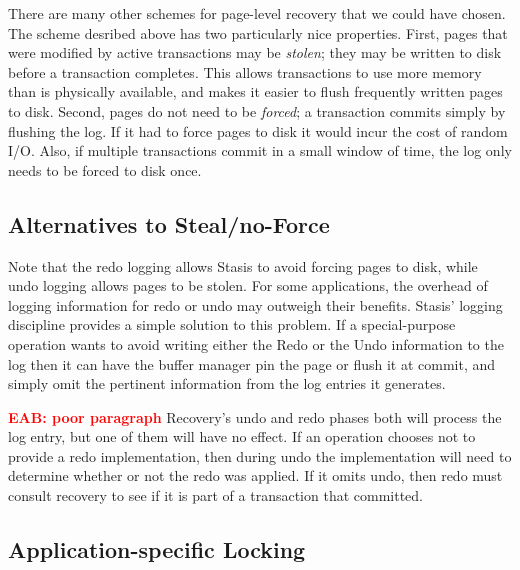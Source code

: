 \documentclass[letterpaper,twocolumn,10pt]{article}
\newcommand{\yad}{Stasis\xspace}
\newcommand{\yads}{Stasis'\xspace}
\newcommand{\eab}[1]{\textcolor{red}{\bf EAB: #1}}
\begin{document}
{There are many other schemes for page-level recovery that we could
have chosen.  The scheme desribed above has two particularly nice
properties.  First, pages that were modified by active transactions
may be {\em stolen}; they may be written to disk before a transaction
completes.  This allows transactions to use more memory than is
physically available, and makes it easier to flush frequently written
pages to disk.  Second, pages do not need to be {\em forced}; a
transaction commits simply by flushing the log.  If it had to force
pages to disk it would incur the cost of random I/O.  Also, if
multiple transactions commit in a small window of time, the log only
needs to be forced to disk once.
}


\subsection{Alternatives to Steal/no-Force}

Note that the redo logging allows \yad to avoid forcing
pages to disk, while undo logging allows pages to be stolen.  For some
applications, the overhead of logging information for redo or undo may
outweigh their benefits.  \yads logging discipline provides a simple
solution to this problem.  If a special-purpose operation wants to
avoid writing either the Redo or the Undo information to the log then
it can have the buffer manager pin the page or flush it at commit, and
simply omit the pertinent information from the log entries it
generates.

\eab{poor paragraph}
Recovery's undo and redo phases both will process the log entry, but
one of them will have no effect.  If an operation chooses not to
provide a redo implementation, then during undo the implementation will need
to determine whether or not the redo was applied.  If it omits undo,
then redo must consult recovery to see if it is part of a transaction that
committed.


\subsection{Application-specific Locking}
\end{document}
